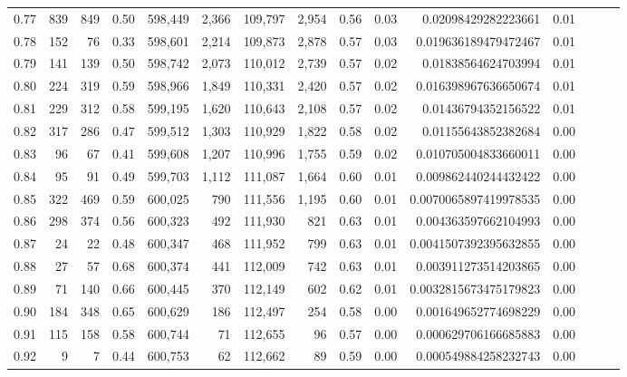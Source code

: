 \begin{tabular}{rrrrrrrrrrrrrrr}
0.77 &     839 &    849 &  0.50 &  598,449 &    2,366 &  109,797 &    2,954 &  0.56 &  0.03 &     0.02098429282223661 &      0.01 \\
0.78 &     152 &     76 &  0.33 &  598,601 &    2,214 &  109,873 &    2,878 &  0.57 &  0.03 &    0.019636189479472467 &      0.01 \\
0.79 &     141 &    139 &  0.50 &  598,742 &    2,073 &  110,012 &    2,739 &  0.57 &  0.02 &     0.01838564624703994 &      0.01 \\
0.80 &     224 &    319 &  0.59 &  598,966 &    1,849 &  110,331 &    2,420 &  0.57 &  0.02 &    0.016398967636650674 &      0.01 \\
0.81 &     229 &    312 &  0.58 &  599,195 &    1,620 &  110,643 &    2,108 &  0.57 &  0.02 &     0.01436794352156522 &      0.01 \\
0.82 &     317 &    286 &  0.47 &  599,512 &    1,303 &  110,929 &    1,822 &  0.58 &  0.02 &     0.01155643852382684 &      0.00 \\
0.83 &      96 &     67 &  0.41 &  599,608 &    1,207 &  110,996 &    1,755 &  0.59 &  0.02 &    0.010705004833660011 &      0.00 \\
0.84 &      95 &     91 &  0.49 &  599,703 &    1,112 &  111,087 &    1,664 &  0.60 &  0.01 &    0.009862440244432422 &      0.00 \\
0.85 &     322 &    469 &  0.59 &  600,025 &      790 &  111,556 &    1,195 &  0.60 &  0.01 &   0.0070065897419978535 &      0.00 \\
0.86 &     298 &    374 &  0.56 &  600,323 &      492 &  111,930 &      821 &  0.63 &  0.01 &    0.004363597662104993 &      0.00 \\
0.87 &      24 &     22 &  0.48 &  600,347 &      468 &  111,952 &      799 &  0.63 &  0.01 &   0.0041507392395632855 &      0.00 \\
0.88 &      27 &     57 &  0.68 &  600,374 &      441 &  112,009 &      742 &  0.63 &  0.01 &    0.003911273514203865 &      0.00 \\
0.89 &      71 &    140 &  0.66 &  600,445 &      370 &  112,149 &      602 &  0.62 &  0.01 &   0.0032815673475179823 &      0.00 \\
0.90 &     184 &    348 &  0.65 &  600,629 &      186 &  112,497 &      254 &  0.58 &  0.00 &    0.001649652774698229 &      0.00 \\
0.91 &     115 &    158 &  0.58 &  600,744 &       71 &  112,655 &       96 &  0.57 &  0.00 &    0.000629706166685883 &      0.00 \\
0.92 &       9 &      7 &  0.44 &  600,753 &       62 &  112,662 &       89 &  0.59 &  0.00 &    0.000549884258232743 &      0.00 \\

\end{tabular}
